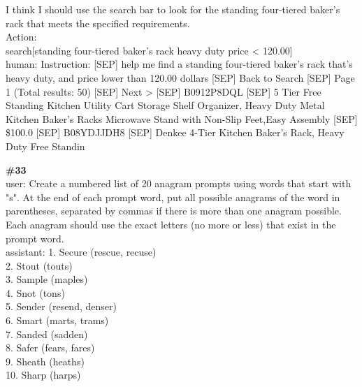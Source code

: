 \documentclass[10pt]{article}
\begin{document}
\begin{Form}
\begin{tcolorbox}[colback=convbg,colframe=itemframe,boxrule=0.8pt,arc=2pt,breakable,left=6pt,right=6pt,top=5pt,bottom=5pt]
{I think I should use the search bar to look for the standing four-tiered baker's rack that meets the specified requirements. \\[2pt]
Action: \\[2pt]
search[standing four-tiered baker's rack heavy duty price < 120.00] \\[2pt]
human: Instruction: [SEP] help me find a standing four-tiered baker's rack that's heavy duty, and price lower than 120.00 dollars [SEP] Back to Search [SEP] Page 1 (Total results: 50) [SEP] Next > [SEP] B0912P8DQL [SEP] 5 Tier Free Standing Kitchen Utility Cart Storage Shelf Organizer, Heavy Duty Metal Kitchen Baker's Racks Microwave Stand with Non-Slip Feet,Easy Assembly [SEP] \$100.0 [SEP] B08YDJJDH8 [SEP] Denkee 4-Tier Kitchen Baker's Rack, Heavy Duty Free Standin}
\end{tcolorbox}
\vspace{-1pt}
\CheckBox[name=q32c,width=1.6ex,height=1.6ex,bordercolor={0.45 0.45 0.45}]{~\textcolor{cbox}{COMPACT}}\quad
\CheckBox[name=q32d,width=1.6ex,height=1.6ex,bordercolor={0.45 0.45 0.45}]{~\textcolor{dbox}{DIFFUSE}}\quad
\CheckBox[name=q32n,width=1.6ex,height=1.6ex,bordercolor={0.45 0.45 0.45}]{~\textcolor{nbox}{NONE}}
\vspace{8pt}
\begin{tcolorbox}[colback=convbg,colframe=itemframe,boxrule=0.8pt,arc=2pt,breakable,left=6pt,right=6pt,top=5pt,bottom=5pt]
{\footnotesize\textbf{\#33}}\\[3pt]
{\footnotesize user: Create a numbered list of 20 anagram prompts using words that start with "s". At the end of each prompt word, put all possible anagrams of the word in parentheses, separated by commas if there is more than one anagram possible. Each anagram should use the exact letters (no more or less) that exist in the prompt word. \\[2pt]
assistant: 1. Secure (rescue, recuse) \\[2pt]
2. Stout (touts) \\[2pt]
3. Sample (maples) \\[2pt]
4. Snot (tons) \\[2pt]
5. Sender (resend, denser) \\[2pt]
6. Smart (marts, trams) \\[2pt]
7. Sanded (sadden) \\[2pt]
8. Safer (fears, fares) \\[2pt]
9. Sheath (heaths) \\[2pt]
10. Sharp (harps) \\[2pt]
}
\end{tcolorbox}
\end{Form}
\end{document}
